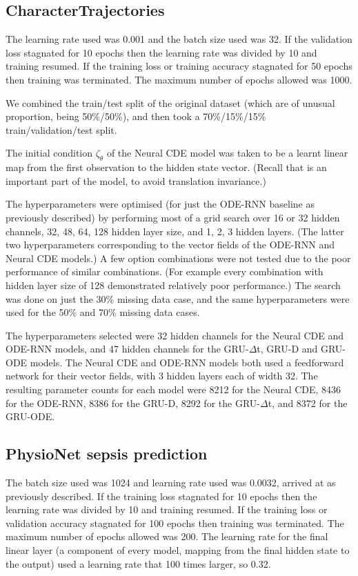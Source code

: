\documentclass{article}
\theoremstyle{plain}
\theoremstyle{definition}
\begin{document}
	\subsection{CharacterTrajectories}\label{appendix:uea}
	The learning rate used was 0.001 and the batch size used was 32. If the validation loss stagnated for 10 epochs then the learning rate was divided by 10 and training resumed. If the training loss or training accuracy stagnated for 50 epochs then training was terminated. The maximum number of epochs allowed was 1000.
	
	We combined the train/test split of the original dataset (which are of unusual proportion, being 50\%/50\%), and then took a 70\%/15\%/15\% train/validation/test split.
	
	The initial condition $\zeta_\theta$ of the Neural CDE model was taken to be a learnt linear map from the first observation to the hidden state vector. (Recall that is an important part of the model, to avoid translation invariance.)
	
	The hyperparameters were optimised (for just the ODE-RNN baseline as previously described) by performing most of a grid search over 16 or 32 hidden channels, 32, 48, 64, 128 hidden layer size, and 1, 2, 3 hidden layers. (The latter two hyperparameters corresponding to the vector fields of the ODE-RNN and Neural CDE models.) A few option combinations were not tested due to the poor performance of similar combinations. (For example every combination with hidden layer size of 128 demonstrated relatively poor performance.) The search was done on just the 30\% missing data case, and the same hyperparameters were used for the 50\% and 70\% missing data cases.
	
	The hyperparameters selected were 32 hidden channels for the Neural CDE and ODE-RNN models, and 47 hidden channels for the GRU-$\Delta$t, GRU-D and GRU-ODE models. The Neural CDE and ODE-RNN models both used a feedforward network for their vector fields, with 3 hidden layers each of width 32. The resulting parameter counts for each model were 8212 for the Neural CDE, 8436 for the ODE-RNN, 8386 for the GRU-D, 8292 for the GRU-$\Delta$t, and 8372 for the GRU-ODE.
	
	\subsection{PhysioNet sepsis prediction}\label{appendix:sepsis}
	The batch size used was 1024 and learning rate used was 0.0032, arrived at as previously described. If the training loss stagnated for 10 epochs then the learning rate was divided by 10 and training resumed. If the training loss or validation accuracy stagnated for 100 epochs then training was terminated. The maximum number of epochs allowed was 200. The learning rate for the final linear layer (a component of every model, mapping from the final hidden state to the output) used a learning rate that 100 times larger, so 0.32.
	
\end{document}
